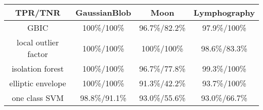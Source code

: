\begin{tabular}{cccc}
\hline
       TPR/TNR        &  GaussianBlob   &      Moon       &  Lymphography  \\
\hline
    GBIC    & 100\%/100\% &  96.7\%/82.2\%  & 97.9\%/100\% \\
 local outlier factor & 100\%/100\% & 100\%/100\% & 98.6\%/83.3\%  \\
   isolation forest   & 100\%/100\% &  96.7\%/77.8\%  & 99.3\%/100\% \\
  elliptic envelope   & 100\%/100\% &  91.3\%/42.2\%  & 93.7\%/100\% \\
    one class SVM     &  98.8\%/91.1\%  &  93.0\%/55.6\%  & 93.0\%/66.7\%  \\
\hline
\end{tabular}
